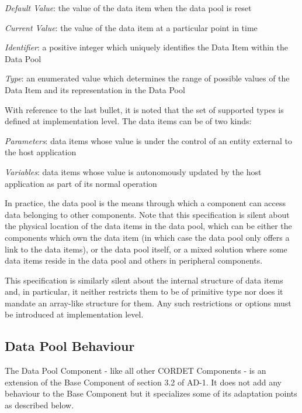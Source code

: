 \documentclass[a4paper,10pt]{article}
\newenvironment{fw_itemize}						%
{\begin{itemize}
  \setlength{\itemsep}{1mm}
  \setlength{\parskip}{0pt}
  \setlength{\parsep}{0pt}}
{\end{itemize}}
\begin{document}
\begin{fw_itemize}
\item \textit{Default Value}: the value of the data item when the data pool is reset
\item \textit{Current Value}: the value of the data item at a particular point in time
\item \textit{Identifier}: a positive integer which uniquely identifies the Data Item within the Data Pool
\item \textit{Type}: an enumerated value which determines the range of possible values of the Data Item and its representation in the Data Pool
\end{fw_itemize}

With reference to the last bullet, it is noted that the set of supported types is defined at implementation level. The data items can be of two kinds:

\begin{fw_itemize}
\item \textit{Parameters}: data items whose value is under the control of an entity external to the host application 
\item \textit{Variables}: data items whose value is autonomously updated by the host application as part of its normal operation
\end{fw_itemize}

In practice, the data pool is the means through which a component can access data belonging to other components. Note that this specification is silent about the physical location of the data items in the data pool, which can be either the components which own the data item (in which case the data pool only offers a link to the data items), or the data pool itself, or a mixed solution where some data items reside in the data pool and others in peripheral components. 

This specification is similarly silent about the internal structure of data items and, in particular, it neither restricts them to be of primitive type nor does it mandate an array-like structure for them. Any such restrictions or options must be introduced at implementation level.

\subsection{Data Pool Behaviour}\label{sec:dpBehaviour}
The Data Pool Component - like all other CORDET Components - is an extension of the Base Component of section 3.2 of AD-1. It does not add any behaviour to the Base Component but it specializes some of its adaptation points as described below.
\end{document}
